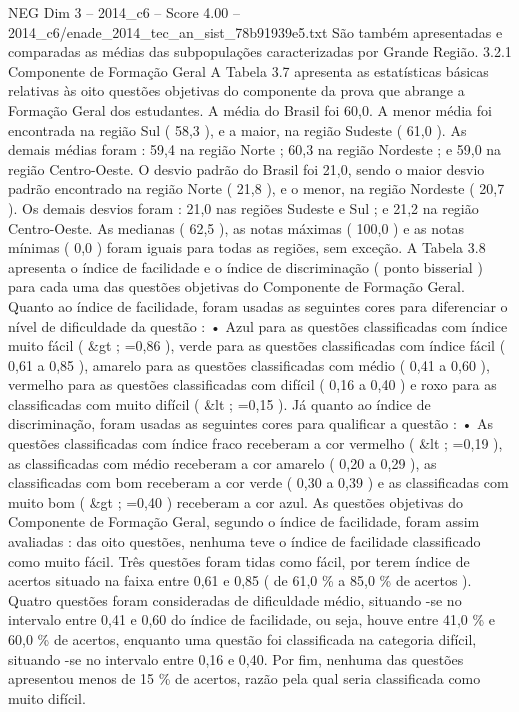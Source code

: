 \begin{textsample}{NEG Dim 3 – 2014\_c6 – Score 4.00 – 2014\_c6/enade\_2014\_tec\_an\_sist\_78b91939e5.txt}
São também apresentadas e comparadas as médias das subpopulações caracterizadas por Grande Região. 3.2.1 Componente de Formação Geral A Tabela 3.7 apresenta as estatísticas básicas relativas às oito questões objetivas do componente da prova que abrange a Formação Geral dos estudantes.
A média do Brasil foi 60,0.
A menor média foi encontrada na região Sul ( 58,3 ), e a maior, na região Sudeste ( 61,0 ).
As demais médias foram : 59,4 na região Norte ; 60,3 na região Nordeste ; e 59,0 na região Centro-Oeste.
O desvio padrão do Brasil foi 21,0, sendo o maior desvio padrão encontrado na região Norte ( 21,8 ), e o menor, na região Nordeste ( 20,7 ).
Os demais desvios foram : 21,0 nas regiões Sudeste e Sul ; e 21,2 na região Centro-Oeste.
As medianas ( 62,5 ), as notas máximas ( 100,0 ) e as notas mínimas ( 0,0 ) foram iguais para todas as regiões, sem exceção.
A Tabela 3.8 apresenta o índice de facilidade e o índice de discriminação ( ponto bisserial ) para cada uma das questões objetivas do Componente de Formação Geral.
Quanto ao índice de facilidade, foram usadas as seguintes cores para diferenciar o nível de dificuldade da questão : • Azul para as questões classificadas com índice muito fácil ( \&gt ; =0,86 ), verde para as questões classificadas com índice fácil ( 0,61 a 0,85 ), amarelo para as questões classificadas com médio ( 0,41 a 0,60 ), vermelho para as questões classificadas com difícil ( 0,16 a 0,40 ) e roxo para as classificadas com muito difícil ( \&lt ; =0,15 ).
Já quanto ao índice de discriminação, foram usadas as seguintes cores para qualificar a questão : • As questões classificadas com índice fraco receberam a cor vermelho ( \&lt ; =0,19 ), as classificadas com médio receberam a cor amarelo ( 0,20 a 0,29 ), as classificadas com bom receberam a cor verde ( 0,30 a 0,39 ) e as classificadas com muito bom ( \&gt ; =0,40 ) receberam a cor azul.
As questões objetivas do Componente de Formação Geral, segundo o índice de facilidade, foram assim avaliadas : das oito questões, nenhuma teve o índice de facilidade classificado como muito fácil.
Três questões foram tidas como fácil, por terem índice de acertos situado na faixa entre 0,61 e 0,85 ( de 61,0 \% a 85,0 \% de acertos ).
Quatro questões foram consideradas de dificuldade médio, situando -se no intervalo entre 0,41 e 0,60 do índice de facilidade, ou seja, houve entre 41,0 \% e 60,0 \% de acertos, enquanto uma questão foi classificada na categoria difícil, situando -se no intervalo entre 0,16 e 0,40.
Por fim, nenhuma das questões apresentou menos de 15 \% de acertos, razão pela qual seria classificada como muito difícil.

\end{textsample}
